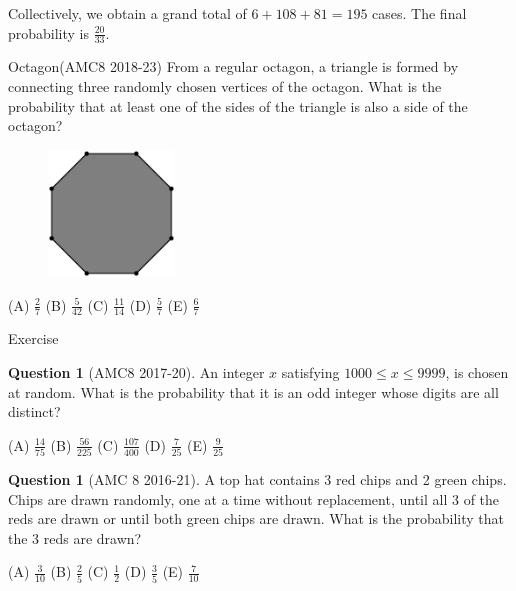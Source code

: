 \documentclass{beamer}
\theoremstyle{definition}
\newtheorem{ques}[defn]{Question}
\begin{document}
Collectively, we obtain a grand total of $6 + 108 + 81 = 195$ cases. The final probability is $\frac{20}{33}$.
\begin{frame}{Octagon(AMC8 2018-23)}
    From a regular octagon, a triangle is formed by connecting three randomly chosen vertices of the octagon. What is the probability that at least one of the sides of the triangle is also a side of the octagon?
    \begin{figure}
        \centering
        \includegraphics[width=0.3\textwidth]{triangle.png}
    \end{figure}

    (A) $\frac{2}{7}$ (B) $\frac{5}{42}$ (C) $\frac{11}{14}$ (D) $\frac{5}{7}$ (E) $\frac{6}{7}$
\end{frame}
\begin{frame}{Exercise}
    
\begin{ques}[AMC8 2017-20]
    An integer $x$ satisfying $1000\le x\le 9999$, is chosen at random. What is the probability that it is an odd integer whose digits are all distinct?
    
    (A) $\frac{14}{75}$ (B) $\frac{56}{225}$ (C) $\frac{107}{400}$ (D) $\frac{7}{25}$ (E) $\frac{9}{25}$
\end{ques}
\begin{ques}[AMC 8 2016-21]
    A top hat contains 3 red chips and 2 green chips. Chips are drawn randomly, one at a time without replacement, until all 3 of the reds are drawn or until both green chips are drawn. What is the probability that the 3 reds are drawn?
    
    (A) $\frac{3}{10}$ (B) $\frac{2}{5}$ (C) $\frac{1}{2}$ (D) $\frac{3}{5}$ (E) $\frac{7}{10}$
\end{ques}

\end{frame}
\end{document}
